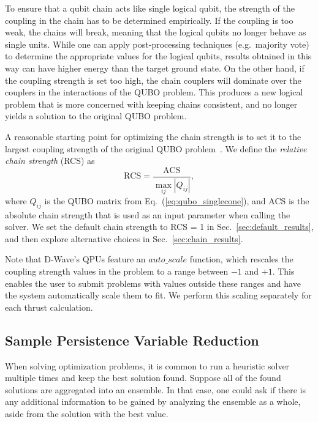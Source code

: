 \documentclass[aps,prd,twocolumn,superscriptaddress,preprintnumbers,nofootinbib,longbibliography,floatfix]{revtex4-1}
\DeclareRobustCommand{\Sec}[1]{Sec.~\ref{sec:#1}}
\DeclareRobustCommand{\Eq}[1]{Eq.~(\ref{eq:#1})}
\begin{document}
To ensure that a qubit chain acts like single logical qubit, the strength of the coupling in the chain has to be determined empirically.
%
If the coupling is too weak, the chains will break, meaning that the logical qubits no longer behave as single units.
%
While one can apply post-processing techniques (e.g.\ majority vote) to determine the appropriate values for the logical qubits, results obtained in this way can have higher energy than the target ground state.
%
On the other hand, if the coupling strength is set too high, the chain couplers will dominate over the couplers in the interactions of the QUBO problem.
%
This produces a new logical problem that is more concerned with keeping chains consistent, and no longer yields a solution to the original QUBO problem.


A reasonable starting point for optimizing the chain strength is to set it to the largest coupling strength of the original QUBO problem~\cite{calaza2021garden}.
%
We define the \textit{relative chain strength} (RCS) as
%
\begin{equation}
    \text{RCS} = \frac{\text{ACS}}{\max_{ij}|Q_{ij}|},
    \label{eq:rcs}
\end{equation}
%
where $Q_{ij}$ is the QUBO matrix from \Eq{qubo_singlecone}, and ACS is the absolute chain strength that is used as an input parameter when calling the solver.
%
We set the default chain strength to RCS = 1 in \Sec{default_results}, and then explore alternative choices in \Sec{chain_results}. 


Note that D-Wave's QPUs feature an $auto\_scale$ function, which rescales the coupling strength values in the problem to a range between $-1$ and $+1$.
%
This enables the user to submit problems with values outside these ranges and have the system automatically scale them to fit.
%
We perform this scaling separately for each thrust calculation.



\subsection{Sample Persistence Variable Reduction}
\label{sec:SPVAR_def}

When solving optimization problems, it is common to run a heuristic solver multiple times and keep the best solution found.
%
Suppose all of the found solutions are aggregated into an ensemble.
%
In that case, one could ask if there is any additional information to be gained by analyzing the ensemble as a whole, aside from the solution with the best value.
\end{document}
